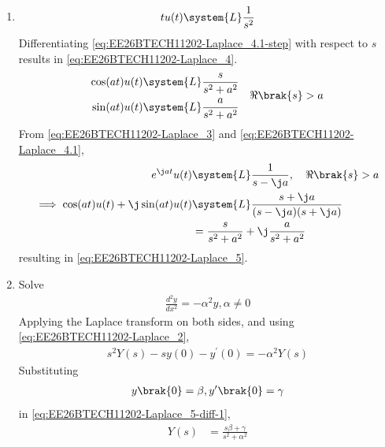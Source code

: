 \begin{enumerate}[label=\thesubsection.\arabic*, ref=\thesubsection.\theenumi]
\begin{align}
	u(t) \system{L} \frac{1}{s} \label{eq:EE26BTECH11202-Laplace_4.1}
\end{align}
\solution
\begin{align}
 \int_{0}^{\infty}  e^{-st} \, dt 
 = \brak{-\frac{e^{-st}}{s}}_{0}^{\infty}  = \frac{1}{s} \quad \Re\brak{s} > 0
\label{eq:EE26BTECH11202-Laplace_4.1-step}
\end{align}
\item 
\begin{align}
	tu(t) \system{L} \frac{1}{s^2} \label{eq:EE26BTECH11202-Laplace_4}
\end{align}
\solution Differentiating
\eqref{eq:EE26BTECH11202-Laplace_4.1-step}
with respect to $s$ results in 
\eqref{eq:EE26BTECH11202-Laplace_4}.
\begin{align}
\begin{split}
	\cos(at) u(t)\system{L} \frac{s}{s^2 + a^2} 
	\\
	\sin(at) u(t)\system{L} \frac{a}{s^2 + a^2}  
\end{split}
\quad 
\Re\brak{s}>a 
\label{eq:EE26BTECH11202-Laplace_5}
\end{align}
\solution
From \eqref{eq:EE26BTECH11202-Laplace_3} and \eqref{eq:EE26BTECH11202-Laplace_4.1},
\begin{align}
	e^{\j at} u(t)&\system{L}  \frac{1}{s-\j a}, \quad  \Re\brak{s}>a \\
	\implies {\cos(at)u(t) + \j\sin(at)u(t)} &\system{L}
	\frac{s + \j a}{(s - \j a)(s + \j a)} 
						 \\
						 &= \frac{s}{s^2 + a^2} + \j \frac{a}{s^2 + a^2}
\end{align}
resulting in \eqref{eq:EE26BTECH11202-Laplace_5}.
\item Solve 
\begin{align}
	\frac{d^2 y}{d x^2}= -\alpha^2 y, \alpha \neq 0
\label{eq:EE26BTECH11202-Laplace_5-diff}
\end{align}
\solution 
Applying the Laplace transform on both sides, and using \eqref{eq:EE26BTECH11202-Laplace_2},
\begin{align}
	s^2Y(s)-sy(0)-y^{\prime}(0)=-\alpha^2 Y(s)
\label{eq:EE26BTECH11202-Laplace_5-diff-1}
\end{align}
Substituting
\begin{align}
y\brak{0} = \beta, y^{\prime}\brak{0} = \gamma
\end{align}
in \eqref{eq:EE26BTECH11202-Laplace_5-diff-1},
\begin{align}
	Y(s)&=\frac{s\beta + \gamma}{s^2 + \alpha^2}
\\

\end{align}
\end{enumerate}
